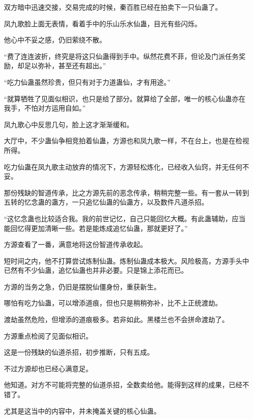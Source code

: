 
\begin{this_body}



双方暗中迅速交接，交易完成的时候，秦百胜已经在拍卖下一只仙蛊了。

凤九歌脸上面无表情，看着手中的乐山乐水仙蛊，目光有些闪烁。

他心中不妥之感，仍旧萦绕不散。

“费了连连波折，终究是将这只仙蛊得到手中。纵然花费不菲，但论及门派任务奖励，却足以弥补，甚至还有超出。”

“吃力仙蛊虽然珍贵，但只有对于力道蛊仙，才有用途。”

“就算牺牲了见面似相识，也只是给了部分。就算给了全部，唯一的核心仙蛊亦在我手，不怕对方运用自如。”

凤九歌心中反思几句，脸上这才渐渐缓和。

大厅中，不少蛊仙争相竞拍着仙蛊，方源也和凤九歌一样，不在台上，也是在检视所得。

吃力仙蛊在凤九歌主动放弃的情况下，方源轻松炼化，已经收入仙窍，并无任何不妥。

那份残缺的智道传承，比之方源先前的恶念传承，稍稍完整一些。有一套从一转到五转的忆念蛊的蛊方，一只追忆仙蛊的仙蛊方，以及数件凡道杀招。

“这忆念蛊也比较适合我。我的前世记忆，自己只能回忆大概。有此蛊辅助，应当能回忆得更加清晰一些。若是能炼成追忆仙蛊，那就更好了。”

方源查看了一番，满意地将这份智道传承收起。

短时间之内，他不打算尝试炼制仙蛊。炼制仙蛊成本极大。风险极高，方源手头中已然有不少仙蛊，追忆仙蛊也并非必要。只是锦上添花而已。

方源的当务之急，仍旧是摆脱仙僵身份，重获新生。

哪怕有吃力仙蛊，可以增添道痕，但也只是稍稍弥补，比不上正统渡劫。

渡劫虽然危险，但增添的道痕极多。若非如此。黑楼兰也不会拼命渡劫了。

方源重点检阅了见面似相识。

这是一份残缺的仙道杀招，初步推断，只有五成。

不过方源却也已经心满意足。

他知道。对方不可能将完整的仙道杀招，全数卖给他。能得到这样的成果，已经不错了。

尤其是这当中的内容中，并未掩盖关键的核心仙蛊。


\end{this_body}
